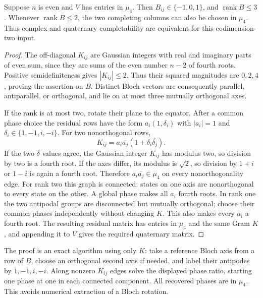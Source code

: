 \begin{theorem}
Suppose $n$ is even and $V$ has entries in $\mu_4$.
Then $B_{ij}\in\{-1,0,1\}$, and $\operatorname{rank}B\le3$.
Whenever $\operatorname{rank}B\le2$, the two completing columns
can also be chosen in $\mu_4$. Thus complex and quaternary
completability are equivalent for this codimension-two input.
\end{theorem}
\begin{proof}
The off-diagonal $K_{ij}$ are Gaussian integers with real and
imaginary parts of even sum, since they are sums of the even number
$n-2$ of fourth roots. Positive semidefiniteness gives $|K_{ij}|\le2$.
Thus their squared magnitudes are $0,2,4$, proving the assertion on
$B$. Distinct Bloch vectors are consequently parallel, antiparallel,
or orthogonal, and lie on at most three mutually orthogonal axes.

If the rank is at most two, rotate their plane to the equator.
After a common phase choice the residual rows have the form
$a_i(1,\delta_i)$ with $|a_i|=1$ and
$\delta_i\in\{1,-1,i,-i\}$. For two nonorthogonal rows,
\[
 K_{ij}=a_i\overline{a_j}(1+\delta_i\overline{\delta_j}).
\]
If the two $\delta$ values agree, the Gaussian integer $K_{ij}$
has modulus two, so division by two is a fourth root. If the axes
differ, its modulus is $\sqrt2$, so division by $1+i$ or $1-i$
is again a fourth root. Therefore $a_i\overline{a_j}\in\mu_4$
on every nonorthogonality edge. For rank two this graph is connected:
states on one axis are nonorthogonal to every state on the other.
A global phase makes all $a_i$ fourth roots. In rank one the two
antipodal groups are disconnected but mutually orthogonal; choose
their common phases independently without changing $K$.
This also makes every $a_i$ a fourth root. The resulting residual
matrix has entries in $\mu_4$ and the same Gram $K$, and appending
it to $V$ gives the required quaternary matrix.
\end{proof}
The proof is an exact algorithm using only $K$: take a reference
Bloch axis from a row of $B$, choose an orthogonal second axis if
needed, and label their antipodes by $1,-1,i,-i$. Along nonzero
$K_{ij}$ edges solve the displayed phase ratio, starting one phase
at one in each connected component. All recovered phases are in
$\mu_4$. This avoids numerical extraction of a Bloch rotation.

